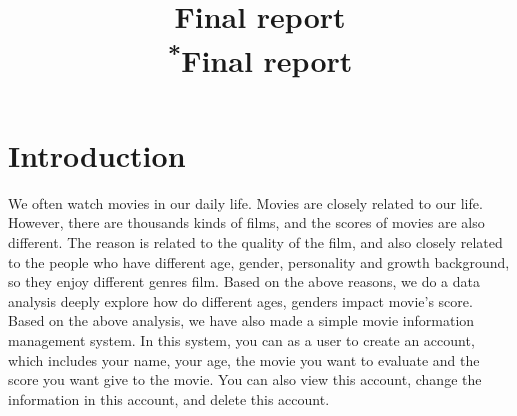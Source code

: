 \documentclass[conference]{IEEEtran}
\begin{document}
\title{Final report\\
{\footnotesize \textsuperscript{*}Final report}
}

\author{
\and
{}
}

\maketitle



\section{Introduction}
We often watch movies in our daily life. Movies are closely related to our life. However, there are thousands kinds of films, and the scores of movies are also different. The reason is related to the quality of the film, and also closely related to the people who have different age, gender, personality and growth background, so they enjoy different genres film. Based on the above reasons, we do a data analysis deeply explore how do different ages, genders impact movie’s score. Based on the above analysis, we have also made a simple movie information management system. In this system, you can as a user to create an account, which includes your name, your age, the movie you want to evaluate and the score you want give to the movie. You can also view this account, change the information in this account, and delete this account.
\end{document}
